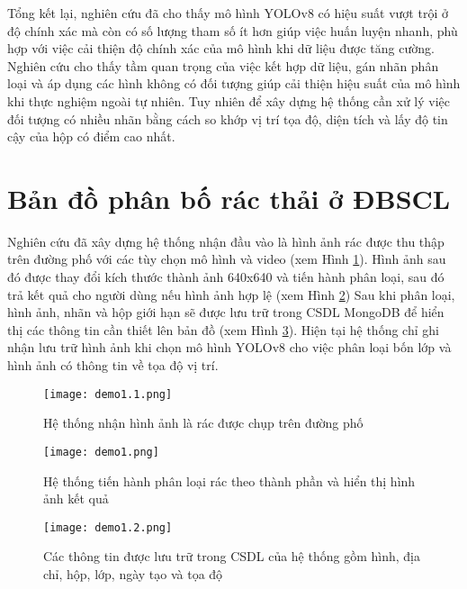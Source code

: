 \documentclass[../the.tex]{subfiles}
\begin{document}
\bigskip
{\fontsize{13}{12} \selectfont

    Tổng kết lại, nghiên cứu đã cho thấy mô hình YOLOv8 có hiệu suất vượt trội ở độ chính xác
    mà còn có số lượng tham số ít hơn giúp việc huấn luyện nhanh, phù hợp với việc cải thiện độ chính xác của mô hình khi dữ liệu được tăng cường.
    Nghiên cứu cho thấy tầm quan trọng của việc kết hợp dữ liệu, gán nhãn phân loại và áp dụng các hình không có đối tượng giúp cải thiện hiệu suất của mô hình khi thực nghiệm ngoài tự nhiên.
    Tuy nhiên để xây dựng hệ thống cần xử lý việc đối tượng có nhiều nhãn bằng cách so khớp vị trí tọa độ, diện tích và lấy độ tin cậy của hộp có điểm cao nhất.
}

\section{Bản đồ phân bố rác thải ở ĐBSCL}
{\fontsize{13}{12} \selectfont 

Nghiên cứu đã xây dựng hệ thống nhận đầu vào là hình ảnh rác được thu thập trên đường phố với các tùy chọn mô hình và video (xem Hình \ref{fig:demo1.1}). 
Hình ảnh sau đó được thay đổi kích thước thành ảnh 640x640 và tiến hành phân loại, sau đó trả kết quả cho người dùng nếu hình ảnh hợp lệ (xem Hình \ref{fig:demo1})
Sau khi phân loại, hình ảnh, nhãn và hộp giới hạn sẽ được lưu trữ trong CSDL MongoDB để hiển thị các thông tin cần thiết lên bản đồ (xem Hình \ref{fig:demo1.2}).
Hiện tại hệ thống chỉ ghi nhận lưu trữ hình ảnh khi chọn mô hình YOLOv8 cho việc phân loại bốn lớp và hình ảnh có thông tin về tọa độ vị trí.

}

\begin{figure}[H]
    \centering
    \texttt{[image: demo1.1.png]}
    \caption{Hệ thống nhận hình ảnh là rác được chụp trên đường phố}
    \label{fig:demo1.1}
\end{figure}

\begin{figure}[H]
    \centering
    \texttt{[image: demo1.png]}
    \caption{Hệ thống tiến hành phân loại rác theo thành phần và hiển thị hình ảnh kết quả}
    \label{fig:demo1}
\end{figure}

\begin{figure}[H]
    \centering
    \texttt{[image: demo1.2.png]}
    \caption{Các thông tin được lưu trữ trong CSDL của hệ thống gồm hình, địa chỉ, hộp, lớp, ngày tạo và tọa độ}
    \label{fig:demo1.2}
\end{figure}
\end{document}
